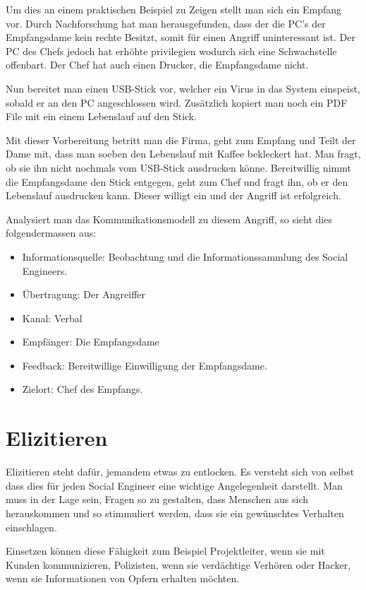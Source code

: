 Um dies an einem praktischen Beispiel zu Zeigen stellt man sich ein Empfang vor. Durch Nachforschung hat man herausgefunden, dass der die PC's der Empfangsdame kein rechte Besitzt, somit für einen Angriff uninteressant ist. Der PC des Chefs jedoch hat erhöhte privilegien wodurch sich eine Schwachstelle offenbart. Der Chef hat auch einen Drucker, die Empfangsdame nicht.

Nun bereitet man einen USB-Stick vor, welcher ein Virus in das System einspeist, sobald er an den PC angeschlossen wird. Zusätzlich kopiert man noch ein PDF File mit ein einem Lebenslauf auf den Stick. 

Mit dieser Vorbereitung betritt man die Firma, geht zum Empfang und Teilt der Dame mit, dass man soeben den Lebenslauf mit Kaffee bekleckert hat. Man fragt, ob sie ihn nicht nochmals vom USB-Stick ausdrucken könne. Bereitwillig nimmt die Empfangsdame den Stick entgegen, geht zum Chef und fragt ihn, ob er den Lebenslauf ausdrucken kann. Dieser willigt ein und der Angriff ist erfolgreich.

Analysiert man das Kommunikationsmodell zu diesem Angriff, so sieht dies folgendermassen aus:
\begin{itemize}
\item Informationsquelle: Beobachtung und die Informationssammlung des Social Engineers.
\item Übertragung: Der Angreiffer
\item Kanal: Verbal
\item Empfänger: Die Empfangsdame
\item Feedback: Bereitwillige Einwilligung der Empfangsdame.
\item Zielort: Chef des Empfangs.
\end{itemize}

\section{Elizitieren}
Elizitieren steht dafür, jemandem etwas zu entlocken. Es versteht sich von selbst dass dies für jeden Social Engineer eine wichtige Angelegenheit darstellt. Man muss in der Lage sein, Fragen so zu gestalten, dass Menschen aus sich herauskommen und so stimmuliert werden, dass sie ein gewünschtes Verhalten einschlagen.

Einsetzen können diese Fähigkeit zum Beispiel Projektleiter, wenn sie mit Kunden kommunizieren, Polizisten, wenn sie verdächtige Verhören oder Hacker, wenn sie Informationen von Opfern erhalten möchten.

